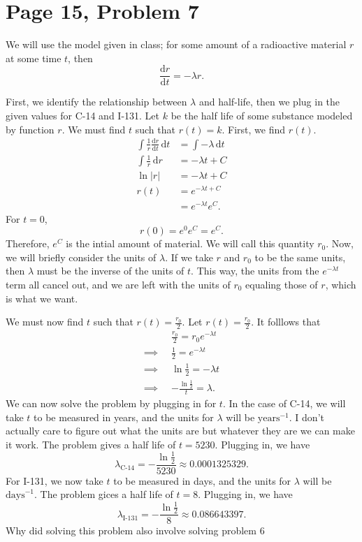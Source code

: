 \documentclass[11pt, letterpaper]{report}
\begin{document}
\section*{Page 15, Problem 7}
\begin{solution}
We will use the model given in class; for some amount of a radioactive material $r$ at some time $t$, then
\[
	\frac{\mathrm{d}r}{\mathrm{d}t} =-\lambda r
.\]

First, we identify the relationship between $\lambda $ and half-life, then we plug in the given values for C-14 and I-131. Let $k$ be the half life of some substance modeled by function $r$. We must find $t$ such that $r(t)=k$. First, we find $r(t)$.
\begin{align*}
	\int \frac{1}{r}\frac{\mathrm{d}r}{\mathrm{d}t}  \,\mathrm{d} t&=\int -\lambda  \,\mathrm{d} t\\
	\int \frac{1}{r} \,\mathrm{d} r&=-\lambda t+C\\
	\ln \left| r \right| &=-\lambda t+C\\
	r(t)&=e^{-\lambda t+C}\\
	    &=e^{-\lambda t}e^C
.\end{align*}
For $t=0$,
\[
	r(0)=e^0e^C=e^C
.\]
Therefore, $e^C$ is the intial amount of material. We will call this quantity $r_0$. Now, we will briefly consider the units of $\lambda $. If we take $r$ and $r_0$ to be the same units, then $\lambda $ must be the inverse of the units of $t$. This way, the units from the $e^{-\lambda t}$ term all cancel out, and we are left with the units of $r_0$ equaling those of $r$, which is what we want.

We must now find $t$ such that $r(t)=\frac{r_0}{2}$. Let $r(t)=\frac{r_0}{2}$. It folllows that
\begin{align*}
	\qquad&\frac{r_0}{2}=r_0e^{-\lambda t}\\
	\implies&\frac{1}{2}=e^{-\lambda t}\\
	\implies&\ln \frac{1}{2}=-\lambda t\\
	\implies&-\frac{\ln \frac{1}{2}}{t}=\lambda 
.\end{align*}
We can now solve the problem by plugging in for $t$. In the case of C-14, we will take $t$ to be measured in years, and the units for $\lambda $ will be $\text{years}^{-1}$. I don't actually care to figure out what the units are but whatever they are we can make it work. The problem gives a half life of $t=5230$. Plugging in, we have
\[
	\lambda_{\text{C-14}}=-\frac{\ln \frac{1}{2}}{5230}\approx 0.0001325329
.\]
For I-131, we now take $t$ to be measured in days, and the units for $\lambda $ will be $\text{days}^{-1}$. The problem gices a half life of  $t=8$. Plugging in, we have
\[
	\lambda_{\text{I-131}}=-\frac{\ln \frac{1}{2}}{8}\approx 0.086643397
.\]
Why did solving this problem also involve solving problem 6


\end{solution}
\end{document}

